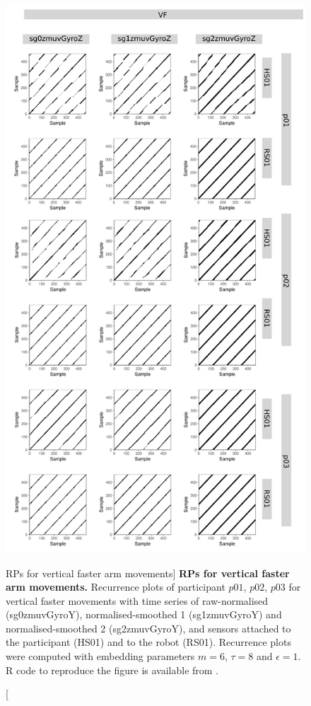\begin{figure}
\centering
\includegraphics[height=0.80\textheight]{rp_VF}
\caption
	[RPs for vertical faster arm movements]{
	{\bf RPs for vertical faster arm movements.}	
	Recurrence plots %
	of participant $p01$, $p02$, $p03$ for vertical faster
	movements with time series of raw-normalised (sg0zmuvGyroY), 
	normalised-smoothed 1 (sg1zmuvGyroY) and 
	normalised-smoothed 2 (sg2zmuvGyroY), and 
	sensors attached to the participant (HS01) and to the robot (RS01).
	Recurrence plots were computed with 
	embedding parameters $m=6$, $\tau=8$ and $\epsilon=1$.
	R code to reproduce the figure is available from \cite{xochicale2018}.
        }
    \label{fig:rp_VF}
\end{figure}
